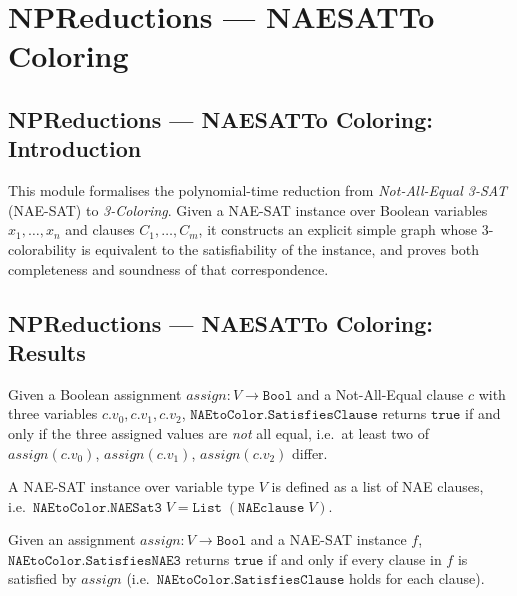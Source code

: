 \section{NPReductions --- NAESATTo Coloring}
\subsection*{NPReductions --- NAESATTo Coloring: Introduction}

This module formalises the polynomial-time reduction from
\emph{Not-All-Equal 3-SAT} (NAE-SAT) to \emph{3-Coloring}.
Given a NAE-SAT instance over Boolean variables $x_1,\dots,x_n$ and clauses
$C_1,\dots,C_m$, it constructs an explicit simple graph whose 3-colorability
is equivalent to the satisfiability of the instance,
and proves both completeness and soundness of that correspondence.

\subsection*{NPReductions --- NAESATTo Coloring: Results}

\begin{definition}
\label{NAEtoColor.SatisfiesClause}
\leanok
{}
Given a Boolean assignment $\mathit{assign} : V \to \mathtt{Bool}$ and a
Not-All-Equal clause $c$ with three variables $c.v_0, c.v_1, c.v_2$,
$\texttt{NAEtoColor.SatisfiesClause}$ returns $\mathtt{true}$ if and only if
the three assigned values are \emph{not} all equal, i.e.\ at least two of
$\mathit{assign}(c.v_0)$, $\mathit{assign}(c.v_1)$, $\mathit{assign}(c.v_2)$
differ.
\end{definition}

\begin{definition}
\label{NAEtoColor.NAESat3}
\leanok
{}
A NAE-SAT instance over variable type $V$ is defined as a list of NAE clauses,
i.e.\ $\texttt{NAEtoColor.NAESat3}\;V = \mathtt{List}\;(\mathtt{NAEclause}\;V)$.
\end{definition}

\begin{definition}
\label{NAEtoColor.SatisfiesNAE3}
\leanok
{}
Given an assignment $\mathit{assign} : V \to \mathtt{Bool}$ and a NAE-SAT
instance $f$, $\texttt{NAEtoColor.SatisfiesNAE3}$ returns $\mathtt{true}$ if
and only if every clause in $f$ is satisfied by $\mathit{assign}$
(i.e.\ $\texttt{NAEtoColor.SatisfiesClause}$ holds for each clause).
\end{definition}

